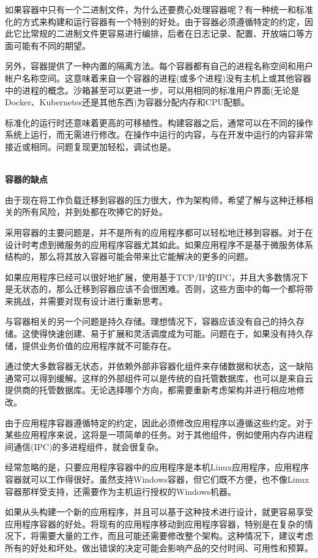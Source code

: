 如果容器中只有一个二进制文件，为什么还要费心处理容器呢？有一种统一和标准化的方式来构建和运行容器有一个特别的好处。由于容器必须遵循特定的约定，因此它比常规的二进制文件更容易进行编排，后者在日志记录、配置、开放端口等方面可能有不同的期望。

另外，容器提供了一种内置的隔离方法。每个容器都有自己的进程名称空间和用户帐户名称空间。这意味着来自一个容器的进程(或多个进程)没有主机上或其他容器中的进程的概念。沙箱甚至可以更进一步，可以用相同的标准用户界面(无论是Docker、Kubernetes还是其他东西)为容器分配内存和CPU配额。

标准化的运行时还意味着更高的可移植性。构建容器之后，通常可以在不同的操作系统上运行，而无需进行修改。在操作中运行的内容，与在开发中运行的内容非常接近或相同。问题复现更加轻松，调试也是。

\hspace*{\fill} \\ %
\noindent
\textbf{容器的缺点}

由于现在将工作负载迁移到容器的压力很大，作为架构师，希望了解与这种迁移相关的所有风险，并到处都在吹捧它的好处。

采用容器的主要问题是，并不是所有的应用程序都可以轻松地迁移到容器。对于在设计时考虑到微服务的应用程序容器尤其如此。如果应用程序不是基于微服务体系结构的，那么将其放入容器可能会带来比它能解决的更多的问题。 

如果应用程序已经可以很好地扩展，使用基于TCP/IP的IPC，并且大多数情况下是无状态的，那么迁移到容器应该不会很困难。否则，这些方面中的每一个都将带来挑战，并需要对现有设计进行重新思考。

与容器相关的另一个问题是持久存储。理想情况下，容器应该没有自己的持久存储。这使得快速创建、易于扩展和灵活调度成为可能。问题在于，如果没有持久存储，提供业务价值的应用程序就不可能存在。

通过使大多数容器无状态，并依赖外部非容器化组件来存储数据和状态，这一缺陷通常可以得到缓解。这样的外部组件可以是传统的自托管数据库，也可以是来自云提供商的托管数据库。无论选择哪个方向，都需要重新考虑架构并进行相应地修改。

由于应用程序容器遵循特定的约定，因此必须修改应用程序以遵循这些约定。对于某些应用程序来说，这将是一项简单的任务。对于其他组件，例如使用内存内进程间通信(IPC)的多进程组件，就会很复杂。

经常忽略的是，只要应用程序容器中的应用程序是本机Linux应用程序，应用程序容器就可以工作得很好。虽然支持Windows容器，但它们既不方便，也不像Linux容器那样受支持，还需要作为主机运行授权的Windows机器。

如果从头构建一个新的应用程序，并且可以基于这种技术进行设计，就更容易享受应用程序容器的好处。将现有的应用程序移动到应用程序容器，特别是在复杂的情况下，将需要大量的工作，而且可能还需要修改整个架构。这种情况下，建议考虑所有的好处和坏处。做出错误的决定可能会影响产品的交付时间、可用性和预算。














